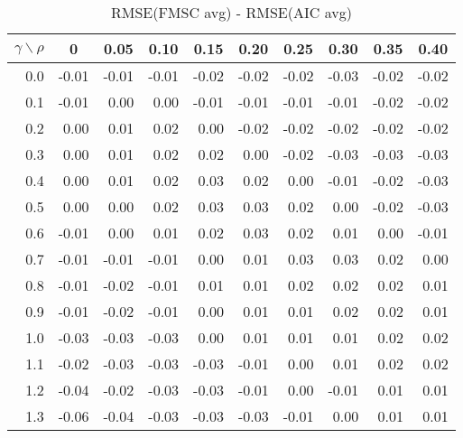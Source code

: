 \documentclass[12pt]{article}
\begin{document}
%
\begin{table}[!tbp]
\caption{RMSE(FMSC avg) - RMSE(AIC avg)}
 \begin{center}
 \begin{tabular}{r|rrrrrrrrr}\hline\hline
\multicolumn{1}{c|}{$\gamma\backslash\rho$}&\multicolumn{1}{c}{0}&\multicolumn{1}{c}{0.05}&\multicolumn{1}{c}{0.10}&\multicolumn{1}{c}{0.15}&\multicolumn{1}{c}{0.20}&\multicolumn{1}{c}{0.25}&\multicolumn{1}{c}{0.30}&\multicolumn{1}{c}{0.35}&\multicolumn{1}{c}{0.40}\tabularnewline
\hline

0.0&-0.01&-0.01&-0.01&-0.02&-0.02&-0.02&-0.03&-0.02&-0.02\tabularnewline
0.1&-0.01& 0.00& 0.00&-0.01&-0.01&-0.01&-0.01&-0.02&-0.02\tabularnewline
0.2& 0.00& 0.01& 0.02& 0.00&-0.02&-0.02&-0.02&-0.02&-0.02\tabularnewline
0.3& 0.00& 0.01& 0.02& 0.02& 0.00&-0.02&-0.03&-0.03&-0.03\tabularnewline
0.4& 0.00& 0.01& 0.02& 0.03& 0.02& 0.00&-0.01&-0.02&-0.03\tabularnewline
0.5& 0.00& 0.00& 0.02& 0.03& 0.03& 0.02& 0.00&-0.02&-0.03\tabularnewline
0.6&-0.01& 0.00& 0.01& 0.02& 0.03& 0.02& 0.01& 0.00&-0.01\tabularnewline
0.7&-0.01&-0.01&-0.01& 0.00& 0.01& 0.03& 0.03& 0.02& 0.00\tabularnewline
0.8&-0.01&-0.02&-0.01& 0.01& 0.01& 0.02& 0.02& 0.02& 0.01\tabularnewline
0.9&-0.01&-0.02&-0.01& 0.00& 0.01& 0.01& 0.02& 0.02& 0.01\tabularnewline
1.0&-0.03&-0.03&-0.03& 0.00& 0.01& 0.01& 0.01& 0.02& 0.02\tabularnewline
1.1&-0.02&-0.03&-0.03&-0.03&-0.01& 0.00& 0.01& 0.02& 0.02\tabularnewline
1.2&-0.04&-0.02&-0.03&-0.03&-0.01& 0.00&-0.01& 0.01& 0.01\tabularnewline
1.3&-0.06&-0.04&-0.03&-0.03&-0.03&-0.01& 0.00& 0.01& 0.01\tabularnewline
\hline
\end{tabular}

\end{center}

\end{table}
\end{document}
